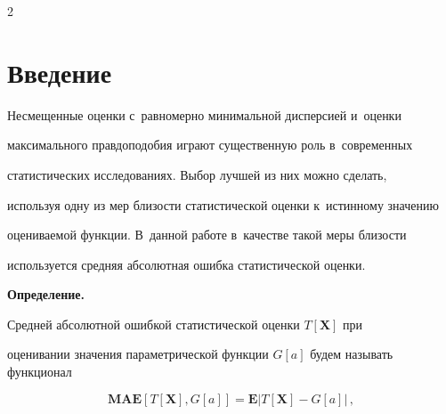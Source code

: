 \thispagestyle{headings}





\begin{multicols}{2}





\label{st\stat}





\section{Введение}





\vspace*{-2pt}





  Несмещенные оценки с~равномерно минимальной дисперсией и~оценки


  максимального правдоподобия  играют существенную роль в~современных


  статистических исследованиях. Выбор лучшей из них можно сделать,


  используя одну из мер близости статистической оценки к~истинному значению


  оцениваемой функции. В~данной работе в~качестве такой меры близости


  используется средняя абсолютная ошибка статистической оценки.


  







\noindent


  \textbf{Определение.} 


  Средней абсолютной ошибкой статистической оценки $T[\mathbf{X}]$ при 


  оценивании значения параметрической функции $G[a]$ будем называть функционал


  


  \noindent


  \begin{equation}


  \mathbf{MAE}\left[T[\mathbf{X}],G[a]\right]=


  \mathbf{E}\left\vert T[\mathbf{X}]-G[a]\right\vert \,,



\end{equation}
\end{multicols}
